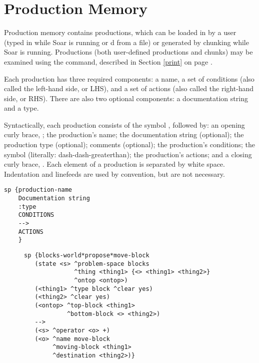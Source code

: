 \section{Production Memory}
\label{SYNTAX-pm}


Production memory contains productions, which can be loaded in by a user
(typed in while Soar is running or d from a file) or
generated by chunking while Soar is running. Productions (both
user-defined productions and chunks) may be examined using the
 command, described in Section \ref{print} on page
\pageref{print}.

Each production has three required components: a name, a set of conditions
(also called the left-hand side, or LHS), and a set of actions (also called the
right-hand side, or RHS).  There are also two optional components: a 
documentation string and a type.

Syntactically, each production consists of the symbol , followed
by: an opening curly brace, \soar{\{}; the production's name; the
documentation string (optional); the production type (optional);
comments (optional); the production's conditions; the symbol \soar{-->}
(literally: dash-dash-greaterthan); the production's actions; and a
closing curly brace, \soar{\}}.  Each element of a production is
separated by white space. Indentation and linefeeds are used by
convention, but are not necessary.

\begin{verbatim}
sp {production-name
    Documentation string
    :type
    CONDITIONS
    -->
    ACTIONS
    }
\end{verbatim}  \vspace{12pt}

\begin{figure}
\begin{verbatim}
sp {blocks-world*propose*move-block
   (state <s> ^problem-space blocks
              ^thing <thing1> {<> <thing1> <thing2>}
              ^ontop <ontop>)
   (<thing1> ^type block ^clear yes)
   (<thing2> ^clear yes)
   (<ontop> ^top-block <thing1>
            ^bottom-block <> <thing2>)
   -->
   (<s> ^operator <o> +)
   (<o> ^name move-block 
        ^moving-block <thing1> 
        ^destination <thing2>)}
\end{verbatim}
\label{fig:ex-prod}
\end{figure}

